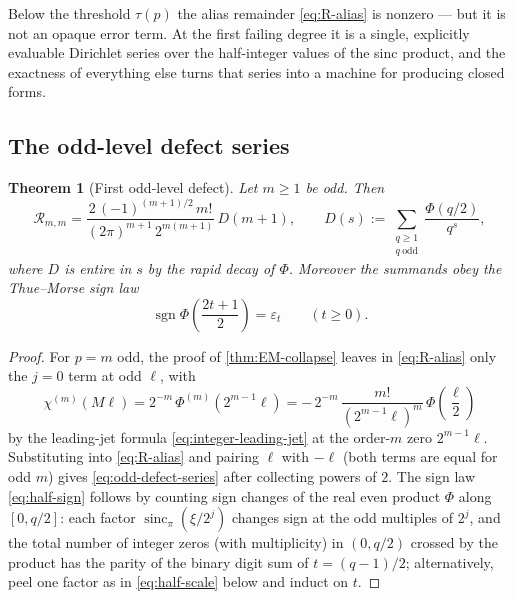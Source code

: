 \documentclass[11pt,oneside]{article}
\numberwithin{equation}{section}
\newtheorem{theorem}{Theorem}[section]
\theoremstyle{definition}
\theoremstyle{remark}
\newcommand{\sincpi}{\operatorname{sinc}_{\pi}}
\newcommand{\eps}{\varepsilon}
\newcommand{\sgn}{\operatorname{sgn}}
\newcommand{\defect}{\mathcal R}
\begin{document}
Below the threshold $\tau(p)$ the alias remainder \eqref{eq:R-alias}
is nonzero --- but it is not an opaque error term.  At the first
failing degree it is a single, explicitly evaluable Dirichlet series
over the half-integer values of the sinc product, and the exactness of
everything else turns that series into a machine for producing closed
forms.

\subsection{The odd-level defect series}

\begin{theorem}[First odd-level defect]
\label{thm:odd-defect}
Let $m\ge1$ be odd.  Then
\begin{equation}
 \boxed{\;
 \defect_{m,m}
 =\frac{2\,(-1)^{(m+1)/2}\,m!}
 {(2\pi)^{m+1}\,2^{m(m+1)}}\,
 D(m+1),
 \qquad
 D(s):=\sum_{\substack{q\ge1\\ q\ \mathrm{odd}}}
 \frac{\Phi(q/2)}{q^{s}},
 \;}
 \label{eq:odd-defect-series}
\end{equation}
where $D$ is entire in $s$ by the rapid decay of $\Phi$.  Moreover the
summands obey the Thue--Morse sign law
\begin{equation}
 \sgn\Phi\!\left(\frac{2t+1}{2}\right)=\eps_t
 \qquad(t\ge0).
 \label{eq:half-sign}
\end{equation}
\end{theorem}

\begin{proof}
For $p=m$ odd, the proof of \cref{thm:EM-collapse} leaves in
\eqref{eq:R-alias} only the $j=0$ term at odd $\ell$, with
\[
 \chi^{(m)}(M\ell)
 =2^{-m}\,\Phi^{(m)}\!\left(2^{m-1}\ell\right)
 =-\,2^{-m}\,\frac{m!}{(2^{m-1}\ell)^{m}}\,
 \Phi\!\left(\frac{\ell}{2}\right)
\]
by the leading-jet formula \eqref{eq:integer-leading-jet} at the
order-$m$ zero $2^{m-1}\ell$.  Substituting into \eqref{eq:R-alias}
and pairing $\ell$ with $-\ell$ (both terms are equal for odd $m$)
gives \eqref{eq:odd-defect-series} after collecting powers of $2$.
The sign law \eqref{eq:half-sign} follows by counting sign changes of
the real even product $\Phi$ along $[0,q/2]$: each factor
$\sincpi(\xi/2^{j})$ changes sign at the odd multiples of $2^{j}$, and
the total number of integer zeros (with multiplicity) in $(0,q/2)$
crossed by the product has the parity of the binary digit sum of
$t=(q-1)/2$; alternatively, peel one factor as in
\eqref{eq:half-scale} below and induct on $t$.
\end{proof}
\end{document}
